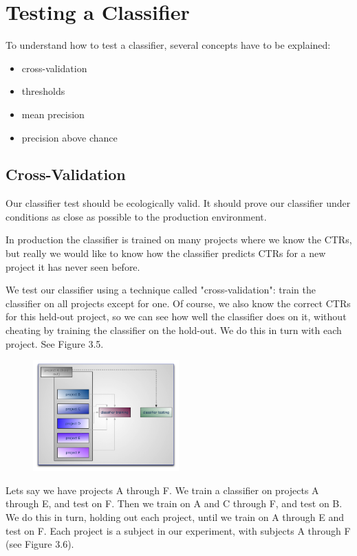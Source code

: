 \section{Testing a Classifier}

To understand how to test a classifier, several concepts have to be explained:

\begin{itemize}
\item cross-validation
\item thresholds
\item mean precision
\item precision above chance
\end{itemize}

\subsection*{Cross-Validation}

Our classifier test should be ecologically valid. It should prove our classifier under conditions as close as possible to the production environment.

In production the classifier is trained on many projects where we know the CTRs, but really we would like to know how the classifier predicts CTRs for a new project it has never seen before.

We test our classifier using a technique called "cross-validation": train the classifier on all projects except for one. Of course, we also know the correct CTRs for this held-out project, so we can see how well the classifier does on it, without cheating by training the classifier on the hold-out. We do this in turn with each project. See Figure 3.5.

\begin{figure}
\centering
\includegraphics[width=0.5\textwidth]{img/testclass/1.png}
\caption{
}
\label{Fig.1}
\end{figure}

Let\textsc{}s say we have projects A through F. We train a classifier on projects A through E, and test on F. Then we train on A and C through F, and test on B. We do this in turn, holding out each project, until we train on A through E and test on F. Each project is a subject in our experiment, with subjects A through F (see Figure 3.6).

